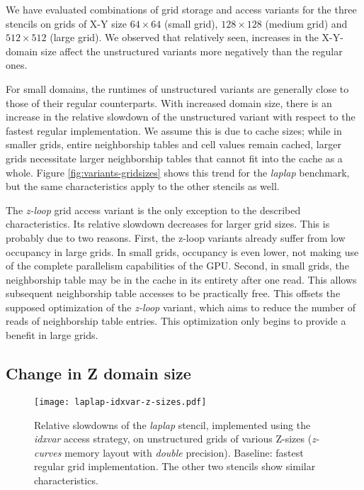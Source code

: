 We have evaluated combinations of grid storage and access variants for the three stencils on grids of X-Y size $64\times 64$ (small grid), $128\times 128$ (medium grid) and $512\times 512$ (large grid). We observed that relatively seen, increases in the X-Y-domain size affect the unstructured variants more negatively than the regular ones.

For small domains, the runtimes of unstructured variants are generally close to those of their regular counterparts. With increased domain size, there is an increase in the relative slowdown of the unstructured variant with respect to the fastest regular implementation. We assume this is due to cache sizes; while in smaller grids, entire neighborship tables and cell values remain cached, larger grids necessitate larger neighborship tables that cannot fit into the cache as a whole. Figure \ref{fig:variants-gridsizes} shows this trend for the \emph{laplap} benchmark, but the same characteristics apply to the other stencils as well.

The \emph{z-loop} grid access variant is the only exception to the described characteristics. Its relative slowdown decreases for larger grid sizes. This is probably due to two reasons. First, the z-loop variants already suffer from low occupancy in large grids. In small grids, occupancy is even lower, not making use of the complete parallelism capabilities of the GPU. Second, in small grids, the neighborship table may be in the cache in its entirety after one read. This allows subsequent neighborship table accesses to be practically free. This offsets the supposed optimization of the \emph{z-loop} variant, which aims to reduce the number of reads of neighborship table entries. This optimization only begins to provide a benefit in large grids.

\subsection{Change in Z domain size}
\label{sec:res-z-size-change}

\begin{figure}
	\begin{center}
    \texttt{[image: laplap-idxvar-z-sizes.pdf]}
	\end{center}
    \caption{\label{fig:laplap-z-sizes} Relative slowdowns of the \emph{laplap} stencil, implemented using the \emph{idxvar} access strategy, on unstructured grids of various Z-sizes (\emph{z-curves} memory layout with \emph{double} precision). Baseline: fastest regular grid implementation. The other two stencils show similar characteristics.}
\end{figure}

